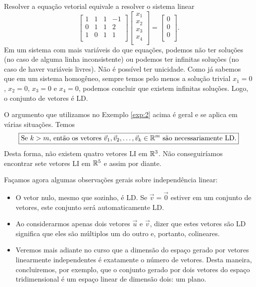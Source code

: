 \documentclass[../livro.tex]{subfiles}
\begin{document}
\begin{example}
Resolver a equação vetorial equivale a resolver o sistema linear
\begin{equation}
\left[
  \begin{array}{cccc}
    1 & 1 & 1 & -1 \\
    0 & 1 & 1 & 2  \\
    1 & 0 & 1 & 1  \\
  \end{array}
\right]
\left[
  \begin{array}{c}
    x_1 \\
    x_2 \\
    x_3 \\
    x_4 \\
  \end{array}
\right] =
\left[
  \begin{array}{c}
    0 \\
    0 \\
    0 \\
  \end{array}
\right].
\end{equation} Em um sistema com mais variáveis do que equações, podemos não ter soluções (no caso de alguma linha inconsistente) ou podemos ter infinitas soluções (no caso de haver variáveis livres). Não é possível ter unicidade. Como já sabemos que em um sistema homogêneo, sempre temos pelo menos a solução trivial $x_1 = 0$, $x_2=0$, $x_3=0$ e $x_4 = 0$, podemos concluir que existem infinitas soluções. Logo, o conjunto de vetores é LD.
\end{example}

O argumento que utilizamos no Exemplo \ref{exp:2} acima é geral e se aplica em várias situações. Temos
\begin{equation}
\boxed{\text{Se $k>m$, então os vetores } \vec{v}_1, \vec{v}_2, \dots, \vec{v}_k  \in \mathbb{R}^m \text{ são necessariamente LD.}}
\end{equation} Desta forma, não existem quatro vetores LI em $\mathbb{R}^3$. Não conseguiríamos encontrar sete vetores LI em $\mathbb{R}^5$ e assim por diante.


Façamos agora algumas observações gerais sobre independência linear:
\begin{itemize}
  \item O vetor nulo, mesmo que sozinho, é LD. Se $\vec{v} = \vec{0}$ estiver em um conjunto de vetores, este conjunto será automaticamente LD.
  \item Ao considerarmos apenas dois vetores $\vec{u}$ e $\vec{v}$, dizer que estes vetores são LD significa que eles são múltiplos um do outro e, portanto, colineares.
  \item Veremos mais adiante no curso que a dimensão do espaço gerado por vetores linearmente independentes é exatamente o número de vetores. Desta maneira, concluiremos, por exemplo, que o conjunto gerado por dois vetores do espaço tridimensional é um espaço linear de dimensão dois: um plano.
\end{itemize}
\end{document}
